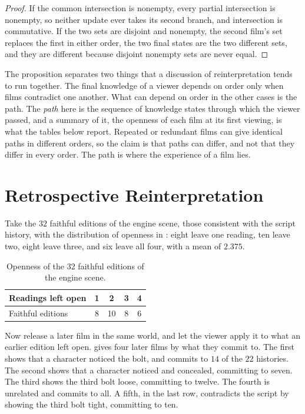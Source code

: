 \documentclass[11pt,twoside,openright]{book}
\theoremstyle{plain}
\theoremstyle{definition}
\theoremstyle{remark}
\begin{document}
\begin{proof}
If the common intersection is nonempty, every partial intersection is nonempty, so neither update ever takes its second branch, and intersection is commutative. If the two sets are disjoint and nonempty, the second film's set replaces the first in either order, the two final states are the two different sets, and they are different because disjoint nonempty sets are never equal.
\end{proof}

The proposition separates two things that a discussion of reinterpretation tends to run together. The final knowledge of a viewer depends on order only when films contradict one another. What can depend on order in the other cases is the path. The \emph{path} here is the sequence of knowledge states through which the viewer passed, and a summary of it, the openness of each film at its first viewing, is what the tables below report. Repeated or redundant films can give identical paths in different orders, so the claim is that paths can differ, and not that they differ in every order. The path is where the experience of a film lies.

\section{Retrospective Reinterpretation}\label{sec:retro14}

Take the $32$ faithful editions of the engine scene, those consistent with the script history, with the distribution of openness in : eight leave one reading, ten leave two, eight leave three, and six leave all four, with a mean of $2.375$.

\begin{table}[ht]
\centering
\begin{tabular}{@{}lcccc@{}}
\toprule
Readings left open & 1 & 2 & 3 & 4\\
\midrule
Faithful editions & 8 & 10 & 8 & 6\\
\bottomrule
\end{tabular}
\caption{Openness of the $32$ faithful editions of the engine scene.}\label{tab:open14}
\end{table}

Now release a later film in the same world, and let the viewer apply it to what an earlier edition left open.  gives four later films by what they commit to. The first shows that a character noticed the bolt, and commits to $14$ of the $22$ histories. The second shows that a character noticed and concealed, committing to seven. The third shows the third bolt loose, committing to twelve. The fourth is unrelated and commits to all. A fifth, in the last row, contradicts the script by showing the third bolt tight, committing to ten.
\end{document}
